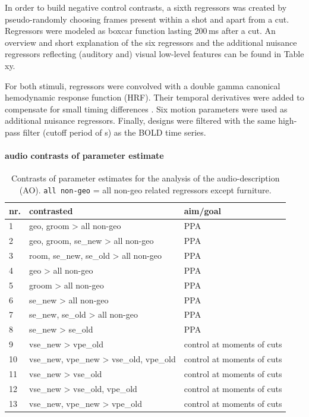 \documentclass[english]{article}
\begin{document}
In order to build negative control contrasts, a sixth regressors was created by pseudo-randomly choosing frames present within a shot and apart from a cut. Regressors were modeled as boxcar function lasting 200\,ms after a cut.
An overview and short explanation of the six regressors and the additional nuisance regressors reflecting (auditory and) visual low-level features can be found in Table xy.

For both stimuli, regressors were convolved with a double gamma canonical hemodynamic response function (HRF).
Their temporal derivatives were added to compensate for small timing differences \citep{friston1998event}.
Six motion parameters were used as additional nuisance regressors. Finally, designs were filtered with the same high-pass filter (cutoff period of \unit[150]{s}) as the BOLD time series.



\paragraph{audio contrasts of parameter estimate}


\begin{table}[t]
\caption{Contrasts of parameter estimates for the analysis of the audio-description (AO).
\texttt{all non-geo} = all non-geo related regressors except furniture.}
\label{tab:ao-contrasts}
\footnotesize
\begin{tabular}{lll}
\toprule
\textbf{nr.} &  \textbf{contrasted} & \textbf{aim/goal} \\
\midrule
1 & geo, groom > all non-geo & PPA \tabularnewline
2 & geo, groom, se\_new > all non-geo & PPA \tabularnewline
3 & room, se\_new, se\_old > all non-geo & PPA \tabularnewline
4 & geo > all non-geo & PPA \tabularnewline
5 & groom > all non-geo & PPA \tabularnewline
6 & se\_new > all non-geo & PPA \tabularnewline
7 & se\_new, se\_old > all non-geo & PPA \tabularnewline
8 & se\_new > se\_old & PPA \tabularnewline
9 & vse\_new > vpe\_old & control at moments of cuts \tabularnewline
10 & vse\_new, vpe\_new > vse\_old, vpe\_old & control at moments of cuts \tabularnewline
11 & vse\_new > vse\_old & control at moments of cuts \tabularnewline
12 & vse\_new > vse\_old, vpe\_old & control at moments of cuts \tabularnewline
13 & vse\_new, vpe\_new > vpe\_old & control at moments of cuts \tabularnewline
\end{tabular}
\end{table}
\end{document}
